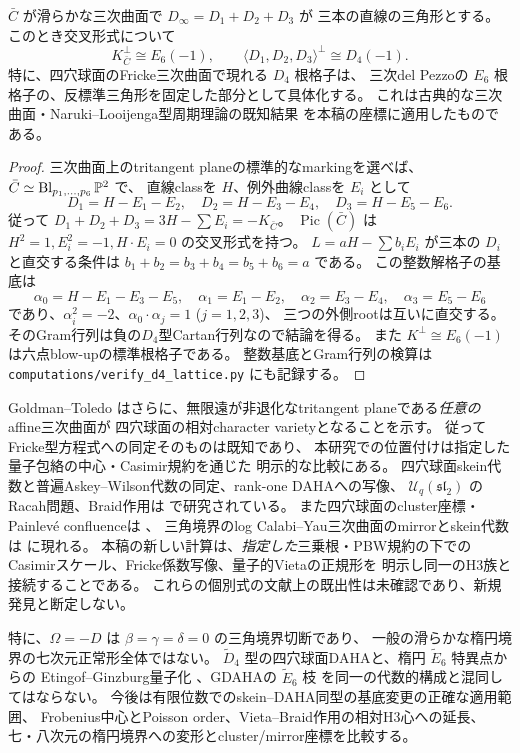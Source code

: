 \begin{proposition}
\label{prop:d4-inside-e6}
$\bar C$ が滑らかな三次曲面で $D_\infty=D_1+D_2+D_3$ が
三本の直線の三角形とする。このとき交叉形式について
\[
 K_{\bar C}^{\perp}\cong E_6(-1),\qquad
 \langle D_1,D_2,D_3\rangle^{\perp}\cong D_4(-1).
\]
特に、四穴球面のFricke三次曲面で現れる $D_4$ 根格子は、
三次del Pezzoの $E_6$ 根格子の、反標準三角形を固定した部分として具体化する。
これは古典的な三次曲面・Naruki--Looijenga型周期理論の既知結果
\cite{SchockD4} を本稿の座標に適用したものである。
\end{proposition}
\begin{proof}
三次曲面上のtritangent planeの標準的なmarkingを選べば、
$\bar C\simeq\operatorname{Bl}_{p_1,\ldots,p_6}\mathbb P^2$ で、
直線classを $H$、例外曲線classを $E_i$ として
\[
 D_1=H-E_1-E_2,\quad D_2=H-E_3-E_4,\quad D_3=H-E_5-E_6.
\]
従って $D_1+D_2+D_3=3H-\sum E_i=-K_{\bar C}$。
$\operatorname{Pic}(\bar C)$ は
$H^2=1,E_i^2=-1,H\cdot E_i=0$ の交叉形式を持つ。
$L=aH-\sum b_iE_i$ が三本の $D_i$ と直交する条件は
$b_1+b_2=b_3+b_4=b_5+b_6=a$ である。
この整数解格子の基底は
\[
 \alpha_0=H-E_1-E_3-E_5,\quad
 \alpha_1=E_1-E_2,\quad
 \alpha_2=E_3-E_4,\quad
 \alpha_3=E_5-E_6
\]
であり、$\alpha_i^2=-2$、$\alpha_0\cdot\alpha_j=1$ ($j=1,2,3$)、
三つの外側rootは互いに直交する。
そのGram行列は負の$D_4$型Cartan行列なので結論を得る。
また $K^\perp\cong E_6(-1)$ は六点blow-upの標準根格子である。
整数基底とGram行列の検算は
\texttt{computations/verify\_d4\_lattice.py} にも記録する。
\end{proof}

\begin{remark}[先行研究との区別と次の比較]
Goldman--Toledo \cite{GoldmanToledo} はさらに、無限遠が非退化なtritangent planeである\emph{任意の}affine三次曲面が
四穴球面の相対character varietyとなることを示す。
従ってFricke型方程式への同定そのものは既知であり、
本研究での位置付けは指定した量子包絡の中心・Casimir規約を通じた
明示的な比較にある。
四穴球面skein代数と普遍Askey--Wilson代数の同定、rank-one DAHAへの写像、
$\mathcal U_q(\mathfrak{sl}_2)$ のRacah問題、Braid作用は
\cite{TerwilligerDAHA,AWAvatars,CookeLacabanne} で研究されている。
また四穴球面のcluster座標・Painlev\'{e} confluenceは \cite{HikamiCluster,CMR}、
三角境界のlog Calabi--Yau三次曲面のmirrorとskein代数は \cite{BousseauSkein} に現れる。
本稿の新しい計算は、\emph{指定した}三乗根・PBW規約の下での
Casimirスケール、Fricke係数写像、量子的Vietaの正規形を
明示し同一のH3族と接続することである。
これらの個別式の文献上の既出性は未確認であり、新規発見と断定しない。

特に、$\Omega=-D$ は $\beta=\gamma=\delta=0$ の三角境界切断であり、
一般の滑らかな楕円境界の七次元正常形全体ではない。
$\widetilde D_4$ 型の四穴球面DAHAと、楕円 $\widetilde E_6$ 特異点からの
Etingof--Ginzburg量子化 \cite{EG}、GDAHAの $\widetilde E_6$ 枝 \cite{EOR}
を同一の代数的構成と混同してはならない。
今後は有限位数でのskein--DAHA同型の基底変更の正確な適用範囲、
Frobenius中心とPoisson order、Vieta--Braid作用の相対H3心への延長、
七・八次元の楕円境界への変形とcluster/mirror座標を比較する。
\end{remark}
